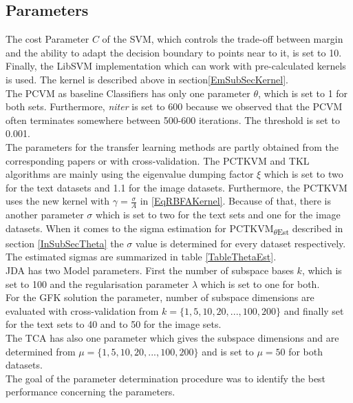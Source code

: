 \subsection{Parameters}
The cost Parameter $C$ of the \acs{SVM}, which controls the trade-off between margin and the ability to adapt the decision boundary to points near to it, is set to 10. \cite[p. 421-422]{TrevorHastie.2009}
Finally, the LibSVM implementation which can work with pre-calculated kernels is used. The kernel is described above in section\ref{EmSubSecKernel}.\\
The PCVM as baseline Classifiers has only one parameter $\theta$, which is set to 1 for both sets.
Furthermore, \textit{niter} is set to 600 because we observed that the \acs{PCVM} often terminates somewhere between 500-600 iterations. The threshold is set to 0.001.\\
The parameters for the transfer learning methods are partly obtained from the corresponding papers or with cross-validation. 
The \acs{PCTKVM} and \acs{TKL} algorithms are mainly using the eigenvalue dumping factor $\xi$ which is set to two for the text datasets and 1.1 for the image datasets.\cite{Long.2015}
Furthermore, the \acs{PCTKVM} uses the new kernel with $\gamma=\frac{\sigma}{A}$ in \eqref{EqRBFAKernel}.
Because of that, there is another parameter $\sigma$ which is set to two for the text sets and one for the image datasets.
When it comes to the sigma estimation for \acs{PCTKVM}\textsubscript{$\theta$Est} described in section \ref{InSubSecTheta} the $\sigma$ value is determined for every dataset respectively.
The estimated sigmas are summarized in table \ref{TableThetaEst}. \\
\acs{JDA} has two Model parameters.
First the number of subspace bases $k$, which is set to 100 and the regularisation parameter $\lambda $ which is set to one for both.\cite{Long.}\\
For the \acs{GFK} solution the parameter, number of subspace dimensions are evaluated with cross-validation from $k=\{1,5,10,20,...,100,200\}$ and finally set for the text sets to 40 and to 50 for the image sets.\\
The \acs{TCA} has also one parameter which gives the subspace dimensions and are determined from $\mu=\{1,5,10,20,...,100,200\}$ and is set to $\mu=50$ for both datasets.\\
The goal of the parameter determination procedure was to identify the best performance concerning the parameters.
